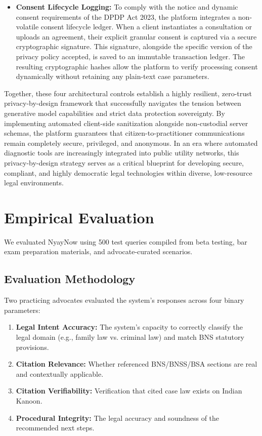 \documentclass[conference]{IEEEtran}
\begin{document}
\begin{itemize}[leftmargin=*]
  \item \textbf{Consent Lifecycle Logging:} To comply with the notice and dynamic consent requirements of the DPDP Act 2023, the platform integrates a non-volatile consent lifecycle ledger. When a client instantiates a consultation or uploads an agreement, their explicit granular consent is captured via a secure cryptographic signature. This signature, alongside the specific version of the privacy policy accepted, is saved to an immutable transaction ledger. The resulting cryptographic hashes allow the platform to verify processing consent dynamically without retaining any plain-text case parameters.
\end{itemize}

Together, these four architectural controls establish a highly resilient, zero-trust privacy-by-design framework that successfully navigates the tension between generative model capabilities and strict data protection sovereignty. By implementing automated client-side sanitization alongside non-custodial server schemas, the platform guarantees that citizen-to-practitioner communications remain completely secure, privileged, and anonymous. In an era where automated diagnostic tools are increasingly integrated into public utility networks, this privacy-by-design strategy serves as a critical blueprint for developing secure, compliant, and highly democratic legal technologies within diverse, low-resource legal environments.

\section{Empirical Evaluation}
\label{sec:eval}

We evaluated NyayNow using 500 test queries compiled from beta testing, bar exam preparation materials, and advocate-curated scenarios.

\subsection{Evaluation Methodology}
Two practicing advocates evaluated the system's responses across four binary parameters:
\begin{enumerate}[leftmargin=*]
  \item \textbf{Legal Intent Accuracy:} The system's capacity to correctly classify the legal domain (e.g., family law vs. criminal law) and match BNS statutory provisions.
  \item \textbf{Citation Relevance:} Whether referenced BNS/BNSS/BSA sections are real and contextually applicable.
  \item \textbf{Citation Verifiability:} Verification that cited case law exists on Indian Kanoon.
  \item \textbf{Procedural Integrity:} The legal accuracy and soundness of the recommended next steps.
\end{enumerate}
\end{document}
